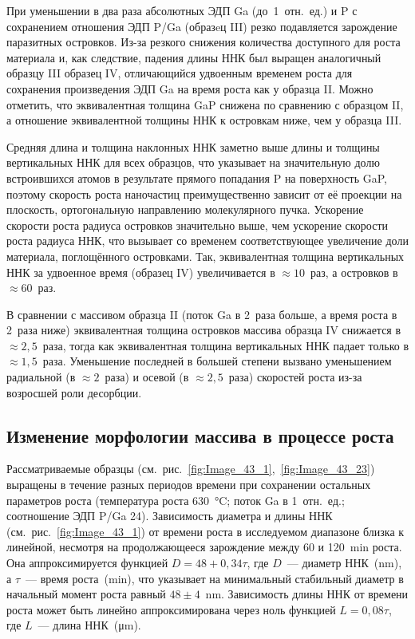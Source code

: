 При уменьшении в два раза абсолютных ЭДП Ga (до~1~отн.~ед.) и P с сохранением
отношения ЭДП P/Ga (образeц III) резко подавляется зарождение паразитных
островков. Из-за резкого снижения количества доступного для роста материала и,
как следствие, падения длины ННК был выращен аналогичный образцу III образец
IV, отличающийся удвоенным временем роста для сохранения произведения ЭДП Ga на
время роста как у образца II. Можно отметить, что эквивалентная толщина GaP
снижена по сравнению с образцом II, а отношение эквивалентной толщины ННК к
островкам ниже, чем у образца III.

Средняя длина и толщина наклонных ННК заметно выше длины и толщины вертикальных
ННК для всех образцов, что указывает на значительную долю встроившихся атомов в
результате прямого попадания P на поверхность GaP, поэтому скорость роста
наночастиц преимущественно зависит от её проекции на плоскость, ортогональную
направлению молекулярного пучка. Ускорение скорости роста радиуса островков
значительно выше, чем ускорение скорости роста радиуса ННК, что вызывает со
временем соответствующее увеличение доли материала, поглощённого островками.
Так, эквивалентная толщина вертикальных ННК за удвоенное время (образец IV)
увеличивается в \(\approx 10\)~раз, а островков в \(\approx 60\)~раз.

В сравнении с массивом образца II (поток Ga в 2~раза больше, а время роста в
2~раза ниже) эквивалентная толщина островков массива образца IV снижается в
\(\approx 2,5\)~раза, тогда как эквивалентная толщина вертикальных ННК падает
только в \(\approx 1,5\)~раза. Уменьшение последней в большей степени вызвано
уменьшением радиальной (в \(\approx 2\)~раза) и осевой (в \(\approx 2,5\)~раза)
скоростей роста из-за возросшей роли десорбции.

\subsection{Изменение морфологии массива в процессе
роста}\label{subsec:ch6/sec2/sub4}

Рассматриваемые образцы
(см.~рис.~\cref{fig:Image_43_1},~\cref{fig:Image_43_23}) выращены в течение
разных периодов времени при сохранении остальных параметров роста (температура
роста 630~\si{\degreeCelsius}; поток Ga в 1~отн.~ед.; соотношение ЭДП P/Ga 24).
Зависимость диаметра и длины ННК (см.~рис.~\cref{fig:Image_43_1}) от времени
роста в исследуемом диапазоне близка к линейной, несмотря на продолжающееся
зарождение между 60 и 120~\si{\minute} роста. Она аппроксимируется функцией \(D
= 48 + 0,34 \tau\), где \(D\)~--- диаметр ННК~(\si{\nano\meter}), а
\(\tau\)~--- время роста~(\si{\minute}), что указывает на минимальный
стабильный диаметр в начальный момент роста равный \(48 \pm
4\)~\si{\nano\meter}. Зависимость длины ННК от времени роста может быть линейно
аппроксимирована через ноль функцией \(L = 0,08 \tau\), где \(L\)~--- длина
ННК~(\si{\micro\meter}).

